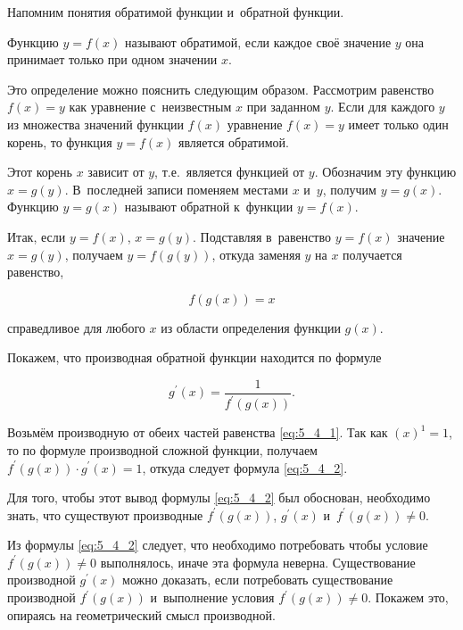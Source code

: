 
Напомним понятия обратимой функции и~обратной функции.

Функцию $y = f(x)$ называют обратимой, если каждое своё значение $y$ она принимает
только при одном значении $x$.

Это определение можно пояснить следующим образом. Рассмотрим равенство $f(x) = y$
как уравнение с~неизвестным $x$ при заданном $y$. Если для каждого $y$ из множества
значений функции $f(x)$ уравнение $f(x) = y$ имеет только один корень,
то функция $y = f(x)$ является обратимой.

Этот корень $x$ зависит от $y$, т.е.\ является функцией от $y$.
Обозначим эту функцию $x = g(y)$. В~последней записи поменяем местами $x$ и~$y$, 
получим $y = g(x)$. Функцию $y = g(x)$ называют обратной к~функции $y = f(x)$.

Итак, если $y = f(x)$, $x = g(y)$. Подставляя в~равенство $y = f(x)$ значение
$x = g(y)$, получаем $y = f\left( g(y) \right)$, откуда заменяя $y$ на $x$
получается равенство,

\begin{equation}\label{eq:5_4_1}
f \left( g(x) \right) = x
\end{equation}

\noindent
справедливое для любого $x$ из области определения функции $g(x)$.

Покажем, что производная обратной функции находится по формуле

\begin{equation}\label{eq:5_4_2}
\displaystyle g^\prime (x) = \frac{1}{f^\prime \left( g(x) \right)}.
\end{equation}

Возьмём производную от обеих частей равенства \eqref{eq:5_4_1}.
Так как $(x)^{1} = 1$, то по формуле производной сложной функции, получаем
$f^\prime \left( g(x) \right) \cdot g^\prime(x) = 1$,
откуда следует формула \eqref{eq:5_4_2}.

Для того, чтобы этот вывод формулы \eqref{eq:5_4_2} был обоснован, необходимо знать,
что существуют производные $f^\prime \left( g(x) \right)$, $g^\prime(x)$
и~$f^\prime\left( g(x) \right) \ne 0$.

Из формулы \eqref{eq:5_4_2} следует, что необходимо потребовать чтобы условие
$f^\prime \left( g(x) \right) \ne 0$ выполнялось, иначе эта формула неверна.
Существование производной $g^\prime (x)$ можно доказать,
если потребовать существование производной $f^\prime \left( g(x) \right)$
и~выполнение условия $f^\prime \left( g(x) \right) \ne 0$.
Покажем это, опираясь на геометрический смысл производной.

